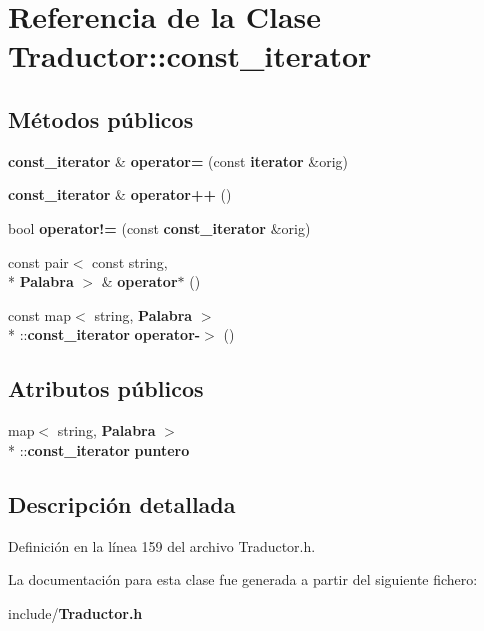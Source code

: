 \section{Referencia de la Clase Traductor\-:\-:const\-\_\-iterator}
\label{classTraductor_1_1const__iterator}
\subsection*{Métodos públicos}
\begin{DoxyCompactItemize}
\item 
{\bf const\-\_\-iterator} \& {\bfseries operator=} (const {\bf iterator} \&orig)\label{classTraductor_1_1const__iterator_aee9075893de51cf721fbfe22d5099eae}

\item 
{\bf const\-\_\-iterator} \& {\bfseries operator++} ()\label{classTraductor_1_1const__iterator_adfb628ecd7e8558f3ea0719256468665}

\item 
bool {\bfseries operator!=} (const {\bf const\-\_\-iterator} \&orig)\label{classTraductor_1_1const__iterator_ad134c4b16bd9db98cd7a4485b6826b04}

\item 
const pair$<$ const string, \\*
{\bf Palabra} $>$ \& {\bfseries operator$\ast$} ()\label{classTraductor_1_1const__iterator_a8a68ea091da9480c210335c14e840b6a}

\item 
const map$<$ string, {\bf Palabra} $>$\\*
\-::{\bf const\-\_\-iterator} {\bfseries operator-\/$>$} ()\label{classTraductor_1_1const__iterator_ab2bfb72f574233b4511b82966e4c8a5d}

\end{DoxyCompactItemize}
\subsection*{Atributos públicos}
\begin{DoxyCompactItemize}
\item 
map$<$ string, {\bf Palabra} $>$\\*
\-::{\bf const\-\_\-iterator} {\bfseries puntero}\label{classTraductor_1_1const__iterator_a93f6b99f591c88b452e1b93fbfb9b3a4}

\end{DoxyCompactItemize}


\subsection{Descripción detallada}


Definición en la línea 159 del archivo Traductor.\-h.



La documentación para esta clase fue generada a partir del siguiente fichero\-:\begin{DoxyCompactItemize}
\item 
include/{\bf Traductor.\-h}\end{DoxyCompactItemize}
